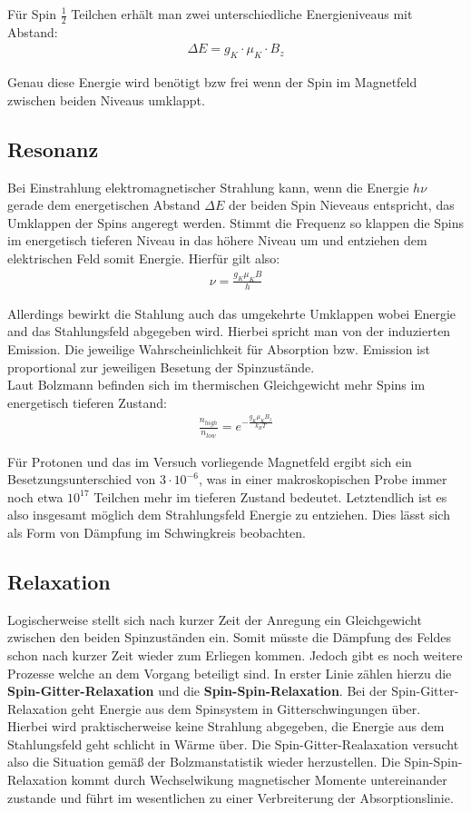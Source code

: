\documentclass[12pt]{article}
\begin{document}
Für Spin $\frac{1}{2}$ Teilchen erhält man zwei unterschiedliche Energieniveaus mit Abstand:
\begin{align}
 \Delta E = g_K \cdot \mu_K \cdot B_z
\end{align}

Genau diese Energie wird benötigt bzw frei wenn der Spin im Magnetfeld zwischen beiden Niveaus umklappt.

\subsection{Resonanz}
Bei Einstrahlung elektromagnetischer Strahlung kann, wenn die Energie $h\nu$ gerade dem energetischen Abstand $\Delta E$ der beiden Spin Nieveaus entspricht, das Umklappen der Spins angeregt werden. Stimmt die Frequenz so klappen die Spins im energetisch tieferen Niveau in das höhere Niveau um und entziehen dem elektrischen Feld somit Energie. Hierfür gilt also:
\begin{align}
 \nu = \frac{g_K \mu_K B}{h}
\label{resfreq}
\end{align}


 Allerdings bewirkt die Stahlung auch das umgekehrte Umklappen wobei Energie and das Stahlungsfeld abgegeben wird. Hierbei spricht man von der induzierten Emission. Die jeweilige Wahrscheinlichkeit für Absorption bzw. Emission ist proportional zur jeweiligen Besetung der Spinzustände.\\

Laut Bolzmann befinden sich im thermischen Gleichgewicht mehr Spins im energetisch tieferen Zustand:
\begin{align}
 \frac{n_{high}}{n_{low}} = e^{-\frac{g_K \mu_K B_z}{k_B T}} 
\end{align}

Für Protonen und das im Versuch vorliegende Magnetfeld ergibt sich ein Besetzungsunterschied von $3\cdot 10^{-6}$, was in einer makroskopischen Probe immer noch etwa $10^{17}$ Teilchen mehr im tieferen Zustand bedeutet. Letztendlich ist es also insgesamt möglich dem Strahlungsfeld Energie zu entziehen. Dies lässt sich als Form von Dämpfung im Schwingkreis beobachten.

\subsection{Relaxation}
Logischerweise stellt sich nach kurzer Zeit der Anregung ein Gleichgewicht zwischen den beiden Spinzuständen ein.
Somit müsste die Dämpfung des Feldes schon nach kurzer Zeit wieder zum Erliegen kommen. Jedoch gibt es noch weitere Prozesse welche an dem Vorgang beteiligt sind. In erster Linie zählen hierzu die \textbf{Spin-Gitter-Relaxation} und die \textbf{Spin-Spin-Relaxation}. Bei der Spin-Gitter-Relaxation geht Energie aus dem Spinsystem in Gitterschwingungen über. Hierbei wird praktischerweise keine Strahlung abgegeben, die Energie aus dem Stahlungsfeld geht schlicht in Wärme über. Die Spin-Gitter-Realaxation versucht also die Situation gemäß der Bolzmanstatistik wieder herzustellen. Die Spin-Spin-Relaxation kommt durch Wechselwikung magnetischer Momente untereinander zustande und führt im wesentlichen zu einer Verbreiterung der Absorptionslinie.\\
\end{document}
